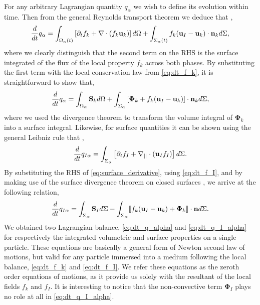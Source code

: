 For any arbitrary Lagrangian quantity $q_\alpha$ we wish to define its evolution within time.
Then from the general Reynolds transport theorem we deduce that \citep{morel2015mathematical},
\begin{equation}
    \frac{d}{d t}  q_\alpha
    = \int_{\Omega_\alpha(t)}\left[ \partial_t f_k + \mathbf{\nabla} \cdot\left(f_k\textbf{u}_k\right) \right]d\Omega\\
    + \int_{\Sigma_\alpha(t)} f_k (\textbf{u}_I-\textbf{u}_k)\cdot \textbf{n}_k d\Sigma,
\end{equation}
where we clearly distinguish  that the second term on the RHS is the surface integrated of the flux of the local property $f_k$ across both phases.
By substituting the first term with the local conservation law from \ref{eq:dt_f_k}, it is straightforward to show that,
\begin{equation}
    \frac{d}{d t}  q_\alpha
    = \int_{\Omega_\alpha} \textbf{S}_k d\Omega
    + \int_{\Sigma_\alpha} \left[\mathbf{\Phi}_k + f_k (\textbf{u}_I-\textbf{u}_k) \right] \cdot \textbf{n}_k d\Sigma,
    \label{eq:dt_q_alpha}
\end{equation}
where we used the divergence theorem to transform the volume integral of $\mathbf{\Phi}_k$ into a surface integral.
Likewise, for surface quantities it can be shown using the general Leibniz rule that \citep{bothe2022sharp,morel2015mathematical,stone1990simple}, 
\begin{equation}
    \frac{d}{d t}  q_{I\alpha}
    = \int_{\Sigma_\alpha} \left[
        \partial_t f_I
        +   \mathbf{\nabla}_{||} \cdot (\textbf{u}_If_I)
    \right]d\Sigma.
    \label{eq:surface_derivative}
\end{equation}
By substituting the RHS of \ref{eq:surface_derivative}, using \ref{eq:dt_f_I}, and by making use of the surface divergence theorem on closed surfaces \citep{kanwal1998generalized}, we arrive at the following relation,
\begin{equation}
    \frac{d}{d t}  q_{I\alpha}
    = \int_{\Sigma_\alpha} 
        \textbf{S}_I
    d\Sigma
    - \int_{\Sigma_\alpha} \llbracket 
        f_k (\textbf{u}_I - \textbf{u}_k)
        + \mathbf{\Phi}_k
     \rrbracket \cdot \textbf{n}
    d\Sigma.
    \label{eq:dt_q_I_alpha}
\end{equation}
We obtained two Lagrangian balance, \ref{eq:dt_q_alpha} and \ref{eq:dt_q_I_alpha} for respectively the integrated volumetric and surface properties on a single particle.
These equations are basically a general form of Newton second law of motions, but valid for any particle immersed into a medium following the local balance, \ref{eq:dt_f_k} and \ref{eq:dt_f_I}. 
We refer these equations as the zeroth order equations of motions, as it provide us solely with the resultant of the local fields $f_k$ and $f_I$.
It is interesting to notice that the non-convective term $\mathbf{\Phi}_I$ plays no role at all in \ref{eq:dt_q_I_alpha}. 

